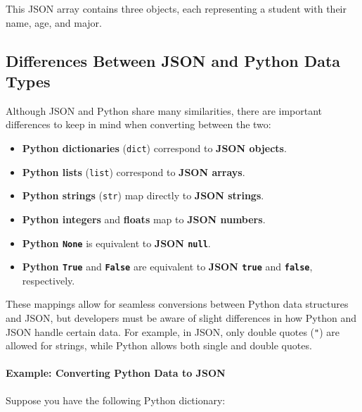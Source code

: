 \documentclass[
  letterpaper,
  DIV=11,
  numbers=noendperiod]{scrreprt}
\let\oldparagraph\paragraph
\renewcommand{\paragraph}[1]{\oldparagraph{#1}\mbox{}}
\providecommand{\tightlist}{%
  \setlength{\itemsep}{0pt}\setlength{\parskip}{0pt}}\usepackage{longtable,booktabs,array}
\begin{document}
This JSON array contains three objects, each representing a student with
their name, age, and major.

\hypertarget{differences-between-json-and-python-data-types}{%
\subsection{Differences Between JSON and Python Data
Types}\label{differences-between-json-and-python-data-types}}

Although JSON and Python share many similarities, there are important
differences to keep in mind when converting between the two:

\begin{itemize}
\tightlist
\item
  \textbf{Python dictionaries} (\texttt{dict}) correspond to
  \textbf{JSON objects}.
\item
  \textbf{Python lists} (\texttt{list}) correspond to \textbf{JSON
  arrays}.
\item
  \textbf{Python strings} (\texttt{str}) map directly to \textbf{JSON
  strings}.
\item
  \textbf{Python integers} and \textbf{floats} map to \textbf{JSON
  numbers}.
\item
  \textbf{Python \texttt{None}} is equivalent to \textbf{JSON
  \texttt{null}}.
\item
  \textbf{Python \texttt{True}} and \textbf{\texttt{False}} are
  equivalent to \textbf{JSON \texttt{true}} and \textbf{\texttt{false}},
  respectively.
\end{itemize}

These mappings allow for seamless conversions between Python data
structures and JSON, but developers must be aware of slight differences
in how Python and JSON handle certain data. For example, in JSON, only
double quotes (\texttt{"}) are allowed for strings, while Python allows
both single and double quotes.

\hypertarget{example-converting-python-data-to-json}{%
\paragraph{Example: Converting Python Data to
JSON}\label{example-converting-python-data-to-json}}

Suppose you have the following Python dictionary:
\end{document}
